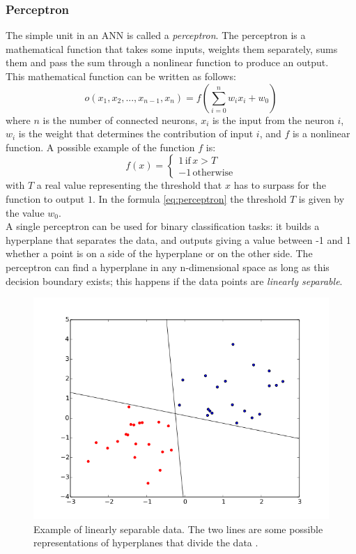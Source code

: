 \subsubsection{Perceptron}
\label{sssec:perc}
The simple unit in an \gls{ANN} is called a \emph{perceptron}. The perceptron is a mathematical function that takes some inputs, weights them separately, sums them and pass the sum through a nonlinear function to produce an output. \\
This mathematical function can be written as follows:
\begin{equation} \label{eq:perceptron}
    o(x_1,x_2,...,x_{n-1}, x_n) = f(\sum_{i=0}^n w_i x_i + w_0)
\end{equation}
\noindent where $n$ is the number of connected neurons, $x_i$ is the input from the neuron $i$, $w_i$ is the weight that determines the contribution of input $i$, and $f$ is a nonlinear function. A possible example of the function $f$ is: 
\begin{equation*}
  f(x) =
    \begin{cases}
      1 \, \text{if} \, x > T \\
      -1 \, \text{otherwise}
    \end{cases}       
\end{equation*}
\noindent with $T$ a real value representing the threshold that $x$ has to surpass for the function to output $1$. In the formula \ref{eq:perceptron} the threshold $T$ is given by the value $w_0$. \\

A single perceptron can be used for binary classification tasks: it builds a hyperplane that separates the data, and outputs giving a value between -1 and 1 whether a point is on a side of the hyperplane or on the other side. The perceptron can find a hyperplane in any n-dimensional space as long as this decision boundary exists; this happens if the data points are \emph{linearly separable}.

\begin{figure}[H]
\centering
    \includegraphics[width=.6\linewidth]{images/Background/ML/Perceptron_cant_choose.svg.png}
\caption[Linearly separable data]{Example of linearly separable data. The two lines are some possible representations of hyperplanes that divide the data \cite{linsep}.}
\label{fig:linsep}
\end{figure}

